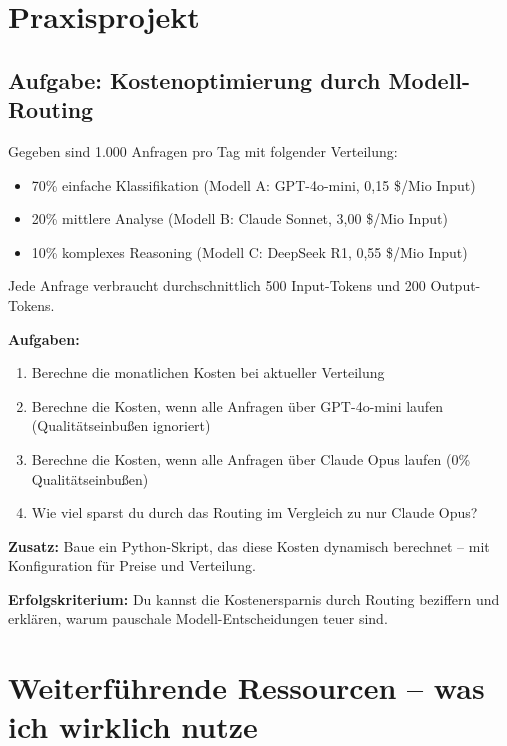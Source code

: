\section{Praxisprojekt}

\subsection{Aufgabe: Kostenoptimierung durch Modell-Routing}

Gegeben sind 1.000 Anfragen pro Tag mit folgender Verteilung:
\begin{itemize}[leftmargin=*]
    \item 70\% einfache Klassifikation (Modell A: GPT-4o-mini, 0,15 \$/Mio Input)
    \item 20\% mittlere Analyse (Modell B: Claude Sonnet, 3,00 \$/Mio Input)
    \item 10\% komplexes Reasoning (Modell C: DeepSeek R1, 0,55 \$/Mio Input)
\end{itemize}

Jede Anfrage verbraucht durchschnittlich 500 Input-Tokens und 200 Output-Tokens.

\textbf{Aufgaben:}
\begin{enumerate}[leftmargin=*]
    \item Berechne die monatlichen Kosten bei aktueller Verteilung
    \item Berechne die Kosten, wenn alle Anfragen über GPT-4o-mini laufen (Qualitätseinbußen ignoriert)
    \item Berechne die Kosten, wenn alle Anfragen über Claude Opus laufen (0\% Qualitätseinbußen)
    \item Wie viel sparst du durch das Routing im Vergleich zu \glqq nur Claude Opus\grqq{}?
\end{enumerate}

\textbf{Zusatz:} Baue ein Python-Skript, das diese Kosten dynamisch berechnet -- mit Konfiguration für Preise und Verteilung.

\textbf{Erfolgskriterium:} Du kannst die Kostenersparnis durch Routing beziffern und erklären, warum pauschale Modell-Entscheidungen teuer sind.

\section{Weiterführende Ressourcen -- was ich wirklich nutze}

